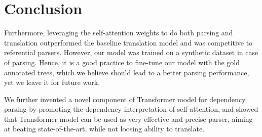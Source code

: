 \chapter*{Conclusion}

Furthermore, leveraging the self-attention weights to do both parsing and translation outperformed the baseline translation model and was competitive to referential parsers. However, our model was trained on a synthetic dataset in case of parsing. Hence, it is a good practice to fine-tune our model with the gold annotated trees, which we believe should lead to a better parsing performance, yet we leave it for future work.

We further invented a novel component of Transformer model for dependency parsing by promoting the dependency interpretation of self-attention, and showed that Transformer model can be used as very effective and precise parser, aiming at beating state-of-the-art, while not loosing ability to translate.
